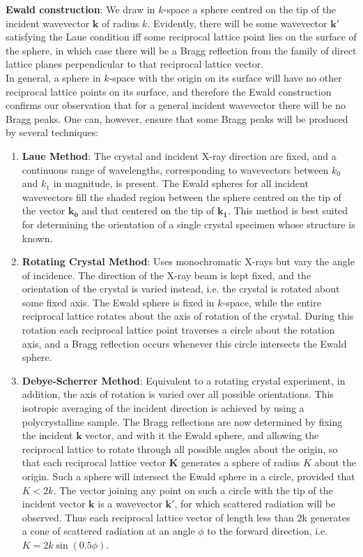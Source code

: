 \documentclass[a4paper]{article}
\begin{document}
\begin{Note}
\textbf{Ewald construction}: We draw in $k$-space a sphere centred on the tip of the incident wavevector $\mathbf{k}$ of radius $k$. Evidently, there will be some wavevector $\mathbf{k'}$ satisfying the Laue condition iff some reciprocal lattice point lies on the surface of the sphere, in which case there will be a Bragg reflection from the family of direct lattice planes perpendicular to that reciprocal lattice vector.\\[5pt]
In general, a sphere in $k$-space with the origin on its surface will have no other reciprocal lattice points on its surface, and therefore the Ewald construction confirms our observation that for a general incident wavevector there will be no Bragg peaks. One can, however, ensure that some Bragg peaks will be produced by several techniques:
\begin{enumerate}
    \item \textbf{Laue Method}: The crystal and incident X-ray direction are fixed, and a continuous range of wavelengths, corresponding to wavevectors between $k_0$ and $k_1$ in magnitude, is present. The Ewald spheres for all incident wavevectors fill the shaded region between the sphere centred on the tip of the vector $\mathbf{k_0}$ and that centered on the tip of $\mathbf{k_1}$. This method is best suited for determining the orientation of a single crystal specimen whose structure is known.
    \item \textbf{Rotating Crystal Method}: Uses monochromatic X-rays but vary the angle of incidence. The direction of the X-ray beam is kept fixed, and the orientation of the crystal is varied instead, i.e. the crystal is rotated about some fixed axis. The Ewald sphere is fixed in $k$-space, while the entire reciprocal lattice rotates about the axis of rotation of the crystal. During this rotation each reciprocal lattice point traverses a circle about the rotation axis, and a Bragg reflection occurs whenever this circle intersects the Ewald sphere.
    \item \textbf{Debye-Scherrer Method}: Equivalent to a rotating crystal experiment, in addition, the axis of rotation is varied over all possible orientations. This isotropic averaging of the incident direction is achieved by using a polycrystalline sample. The Bragg reflections are now determined by fixing the incident $\mathbf{k}$ vector, and with it the Ewald sphere, and allowing the reciprocal lattice to rotate through all possible angles about the origin, so that each reciprocal lattice vector $\mathbf{K}$ generates a sphere of radius $K$ about the origin. Such a sphere will intersect the Ewald sphere in a circle, provided that $K<2k$. The vector joining any point on such a circle with the tip of the incident vector $\mathbf{k}$ is a wavevector $\mathbf{k'}$, for which scattered radiation will be observed. Thus each reciprocal lattice vector of length less than 2k generates a cone of scattered radiation at an angle $\phi$ to the forward direction, i.e. $K=2k\sin(0.5\phi)$.
\end{enumerate}
\end{Note}
\end{document}
